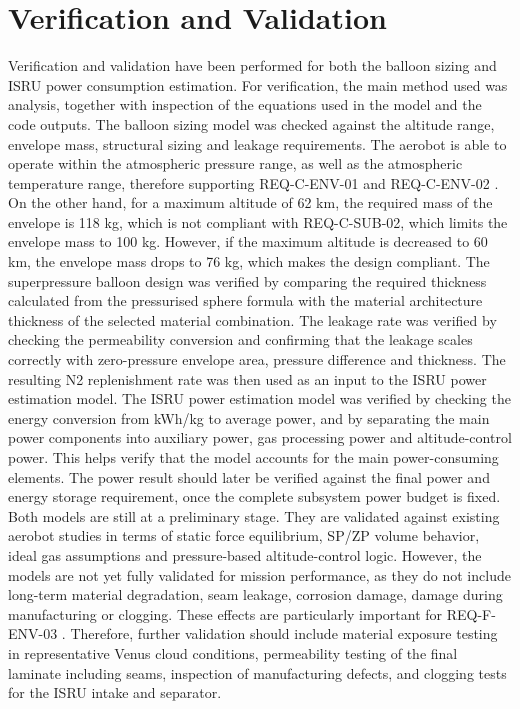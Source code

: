 \section*{Verification and Validation}
Verification and validation have been performed for both the balloon sizing and ISRU power consumption estimation.
For verification, the main method used was analysis, together with inspection of the equations used in the model and the code outputs. The balloon sizing model was checked against the altitude range, envelope mass, structural sizing and leakage requirements.
The aerobot is able to operate within the atmospheric pressure range, as well as the atmospheric temperature range, therefore supporting REQ-C-ENV-01 and REQ-C-ENV-02 \cite{baseline_vista}. On the other hand, for a maximum altitude of 62 km, the required mass of the envelope is 118 kg, which is not compliant with REQ-C-SUB-02, which limits the envelope mass to 100 kg. However, if the maximum altitude is decreased to 60 km, the envelope mass drops to 76 kg, which makes the design compliant.
The superpressure balloon design was verified by comparing the required thickness calculated from the pressurised sphere formula with the material architecture thickness of the selected material combination. The leakage rate was verified by checking the permeability conversion and confirming that the leakage scales correctly with zero-pressure envelope area, pressure difference and thickness. The resulting N2 replenishment rate was then used as an input to the ISRU power estimation model.
\newline
The ISRU power estimation model was verified by checking the energy conversion from kWh/kg to average power, and by separating the main power components into auxiliary power, gas processing power and altitude-control power. This helps verify that the model accounts for the main power-consuming elements. The power result should later be verified against the final power and energy storage requirement, once the complete subsystem power budget is fixed.
\newline
Both models are still at a preliminary stage. They are validated against existing aerobot studies in terms of static force equilibrium, SP/ZP volume behavior, ideal gas assumptions and pressure-based altitude-control logic. However, the models are not yet fully validated for mission performance, as they do not include long-term material degradation, seam leakage, corrosion damage, damage during manufacturing or clogging. These effects are particularly important for REQ-F-ENV-03 \cite{baseline_vista}. Therefore, further validation should include material exposure testing in representative Venus cloud conditions, permeability testing of the final laminate including seams, inspection of manufacturing defects, and clogging tests for the ISRU intake and separator.
